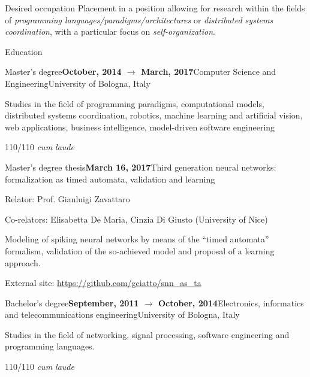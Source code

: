 \documentclass{resume} %
\begin{document}
\begin{rSection}{Desired occupation}
Placement in a position allowing for research within the fields of \emph{programming languages/pa\-ra\-digms/ar\-chi\-tectures} or \emph{distributed systems coordination}, with a particular focus on \emph{self-organization}.
\end{rSection}


\begin{rSection}{Education}
\begin{rSubsection}{Master's degree}{\textbf{October, 2014 $\rightarrow$ March, 2017}}{Computer Science and Engineering}{University of Bologna, Italy}
\item Studies in the field of programming paradigms, computational models, distributed systems coordination, robotics, machine learning and artificial vision, web applications, business intelligence, model-driven software engineering

\item 110/110 \emph{cum laude}
\end{rSubsection}
\begin{rSubsection}{Master's degree thesis}{\textbf{March 16, 2017}}{Third generation neural networks: formalization as timed automata, validation and learning}{\begin{flushright}
			Relator: Prof. Gianluigi Zavattaro
		\end{flushright}}
	\item Co-relators: Elisabetta De Maria, Cinzia Di Giusto (University of Nice)
	\item Modeling of spiking neural networks by means of the ``timed automata'' formalism, validation of the so-achieved model and proposal of a learning approach.
	
	\item External site: \url{https://github.com/gciatto/snn_as_ta}
\end{rSubsection}
\begin{rSubsection}{Bachelor's degree}{\textbf{September, 2011 $\rightarrow$ October, 2014}}{Electronics, informatics and telecommunications engineering}{University of Bologna, Italy}
	\item Studies in the field of networking, signal processing, software engineering and programming languages.
	\item 110/110 \emph{cum laude}
\end{rSubsection}


\end{rSection}
\end{document}
